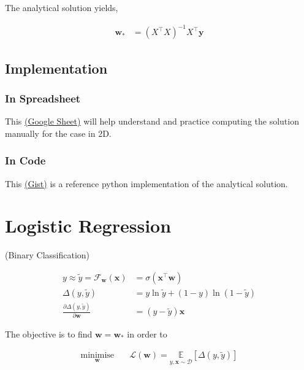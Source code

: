 \documentclass[11pt]{article}
\begin{document}
The analytical solution yields,

\begin{align*}
  \mathbf{w}_* &= (X^{\top}X)^{-1}X^{\top}\mathbf{y}
\end{align*}

\subsection{Implementation}
\label{sec:org67103e8}

\subsubsection{In Spreadsheet}
\label{sec:org209d777}
This \href{https://docs.google.com/spreadsheets/d/1MrwsA75WUano\_aKpeOibALiCOumbdiQv-609A6fEC-c/edit?usp=sharing}{(Google Sheet)} will help understand and practice
computing the solution manually for the case in 2D.
\subsubsection{In Code}
\label{sec:org7da3954}
This \href{https://gist.github.com/bvraghav/4b81c850cd7f3c9784493a465ba592ca}{(Gist)} is a reference python implementation of the
analytical solution.


\section{Logistic Regression}
\label{sec:org1a5d668}

(Binary Classification)

\begin{align*}
  y \approx \widetilde{y} = \mathcal{F}_{\mathbf{w}}(\mathbf{x})
  &= \sigma(\mathbf{x}^{\top}\mathbf{w}) \\
  \Delta\left(y, \widetilde{y} \right)
  &= y\ln \widetilde{y} + (1-y)
    \ln (1-\widetilde{y}) \\
  \frac{\partial \Delta(y,\widetilde{y})} {\partial
  \mathbf{w}}
  &= (y-\widetilde{y})\mathbf{x}
\end{align*}

The objective is to find \(\mathbf{w}=\mathbf{w}_*\) in
order to

\begin{align*}
  \underset{\mathbf{w}}{\text{minimise}}
  &\quad \mathcal{L}(\mathbf{w}) = \underset{y,
    \mathbf{x} \sim \mathcal{D}}{\mathbb{E}}
    \left[ \Delta\left(y, \widetilde{y} \right) \right]
\end{align*}
\end{document}
